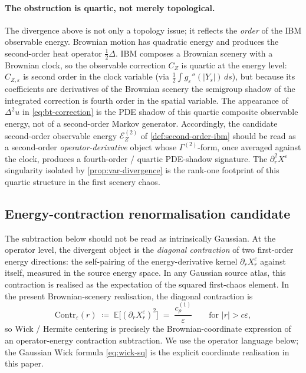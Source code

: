 \documentclass[11pt,reqno]{amsart}
\theoremstyle{plain}
\theoremstyle{definition}
\theoremstyle{remark}
\newcommand{\E}{\mathbb{E}}
\newcommand{\Energy}{\mathcal{E}}
\newcommand{\IBM}{Z}
\newcommand{\Carre}{\Gamma}
\begin{document}
\paragraph{The obstruction is quartic, not merely topological.}
The divergence above is not only a topology issue; it reflects the
\emph{order} of the IBM observable energy. Brownian motion has
quadratic energy and produces the second-order heat operator
$\tfrac12\Delta$. IBM composes a Brownian scenery with a Brownian
clock, so the observable correction $C_\IBM$ is quartic at the
energy level: $C_{\IBM,\varepsilon}$ is second order in the clock
variable (via $\tfrac12\int g_\varepsilon''(|Y_s|)\,ds$), but because
its coefficients are derivatives of the Brownian scenery the
semigroup shadow of the integrated correction is fourth order in the
spatial variable. The appearance of $\Delta^{2}u$ in
\eqref{eq:bt-correction} is the PDE shadow of this quartic composite
observable energy, not of a second-order Markov generator.
Accordingly, the candidate second-order observable energy
$\Energy_\IBM^{(2)}$ of \cref{def:second-order-ibm} should be read as
a second-order \emph{operator-derivative} object whose
$\Carre^{(2)}$-form, once averaged against the clock, produces a
fourth-order / quartic PDE-shadow signature. The
$\partial_r^{2}X^\varepsilon$ singularity isolated by
\cref{prop:var-divergence} is the rank-one footprint of this
quartic structure in the first scenery chaos.

\subsection*{Energy-contraction renormalisation candidate}

The subtraction below should not be read as intrinsically Gaussian.
At the operator level, the divergent object is the
\emph{diagonal contraction} of two first-order energy directions: the
self-pairing of the energy-derivative kernel
$\partial_rX^\varepsilon_r$ against itself, measured in the source
energy space. In any Gaussian source atlas, this contraction is
realised as the expectation of the squared first-chaos element. In the
present Brownian-scenery realisation, the diagonal contraction is
\begin{equation}\label{eq:contraction}
  \mathrm{Contr}_\varepsilon(r)
  \;\coloneqq\;\E\bigl[(\partial_rX^\varepsilon_r)^{2}\bigr]
  \;=\;\frac{c_\rho^{(1)}}{\varepsilon}
  \qquad\text{for }|r|>c\varepsilon,
\end{equation}
so Wick / Hermite centering is precisely the Brownian-coordinate
expression of an operator-energy contraction subtraction. We use the
operator language below; the Gaussian Wick formula \eqref{eq:wick-sq}
is the explicit coordinate realisation in this paper.
\end{document}
